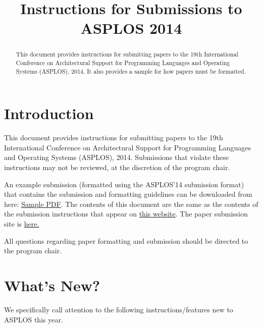 \documentclass[pageno]{jpaper}
\begin{document}
\title{
Instructions for Submissions to ASPLOS 2014}

\date{}
\maketitle

\thispagestyle{empty}

\begin{abstract}

This document provides instructions for submitting papers to the 19th
International Conference on Architectural Support for Programming Languages
and Operating Systems (ASPLOS), 2014.  It also provides a sample for how
papers must be formatted.
\end{abstract}

\section{Introduction}

This document provides instructions for submitting papers to the 19th
International Conference on Architectural Support for Programming Languages
and Operating Systems (ASPLOS), 2014.  Submissions that violate these
instructions may not be reviewed, at the discretion of the program chair.

An example submission (formatted using the ASPLOS'14 submission format)
that contains the submission and formatting guidelines can be downloaded
from here:
\href{http://www.cs.utah.edu/asplos14/files/asplos14-template.pdf}{Sample
PDF}. The contents of this document are the same as the contents of the
submission instructions that appear on
\href{http://www.cs.utah.edu/asplos14/submission.html}{this website}.  The
paper submission site is \href{http://asplos14.cs.illinois.edu}{here.}

All questions regarding paper formatting and submission should be directed
to the program chair.

\section{What's New?}

We specifically call attention to the following instructions/features new
to ASPLOS this year. 
\end{document}
